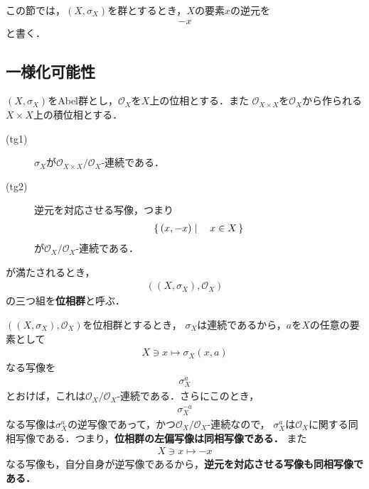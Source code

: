 	この節では，$\left(X,\sigma_X\right)$を群とするとき，$X$の要素$x$の逆元を
	\begin{align}
		-x
	\end{align}
	と書く．
	
\subsection{一様化可能性}
	\begin{screen}
		\begin{dfn}[位相群]\label{def:topological_group}
			$\left(X,\sigma_X\right)$をAbel群とし，$\mathscr{O}_X$を$X$上の位相とする．また
			$\mathscr{O}_{X \times X}$を$\mathscr{O}_X$から作られる$X \times X$上の積位相とする．
			\begin{description}
				\item[(tg1)] $\sigma_X$が$\mathscr{O}_{X \times X}/\mathscr{O}_X$-連続である．
				\item[(tg2)] 逆元を対応させる写像，つまり
					\begin{align}
						\left\{\, (x,-x) \mid \quad x \in X\, \right\}
					\end{align}
					が$\mathscr{O}_X/\mathscr{O}_X$-連続である．
			\end{description}
			が満たされるとき，
			\begin{align}
				\left(\left(X,\sigma_X\right),\mathscr{O}_X\right)
				\label{pair_topological_group}
			\end{align}
			の三つ組を{\bf 位相群}と呼ぶ．
		\end{dfn}
	\end{screen}
	
	$\left(\left(X,\sigma_X\right),\mathscr{O}_X\right)$を位相群とするとき，
	$\sigma_X$は連続であるから，$a$を$X$の任意の要素として
	\begin{align}
		X \ni x \longmapsto \sigma_X(x,a)
	\end{align}
	なる写像を
	\begin{align}
		\sigma_X^a
	\end{align}
	とおけば，これは$\mathscr{O}_X/\mathscr{O}_X$-連続である．さらにこのとき，
	\begin{align}
		\sigma_X^{-a}
	\end{align}
	なる写像は$\sigma_X^a$の逆写像であって，かつ$\mathscr{O}_X/\mathscr{O}_X$-連続なので，
	$\sigma_X^a$は$\mathscr{O}_X$に関する同相写像である．つまり，{\bf 位相群の左偏写像は同相写像である．}
	また
	\begin{align}
		X \ni x \longmapsto -x
	\end{align}
	なる写像も，自分自身が逆写像であるから，{\bf 逆元を対応させる写像も同相写像である．}
	
